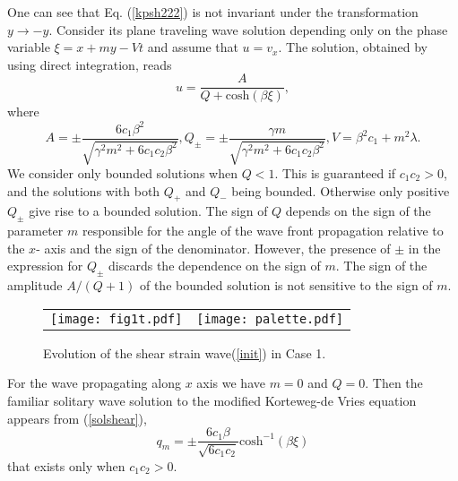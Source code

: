 One can see that Eq. (\ref{kpsh222}) is not invariant under the transformation $y\rightarrow -y$.  Consider its plane traveling wave solution depending only on the phase variable $\xi=x+ m y-V t$ and assume that $u=v_x$. 
The solution, obtained by using direct integration, reads
\begin{equation}
	u=\frac{A}{Q+{\text{cosh}}( \beta \xi)},\label{solshear}
\end{equation}
where
\begin{equation}
	A=\pm \frac{6c_1 \beta^2}{\sqrt{\gamma^2 m^2+6 c_1 c_2 \beta^2}}, 
	Q_{\pm}=\pm\frac{\gamma m }{\sqrt{\gamma^2 m^2+6 c_1 c_2 \beta^2}},  V=\beta^2 c_1+m^2 \lambda . \label{solshearpar}
\end{equation}
We consider only bounded solutions when $Q<1$. This is guaranteed if $c_1 c_2>0$, and the solutions with both $Q_{+}$  and $Q_{-}$ being bounded. Otherwise only positive $Q_{\pm}$ give rise to a bounded solution.  The sign of $Q$ depends on the sign of the parameter $m$ responsible for the angle of the wave front propagation relative to the $x$- axis and the sign of the denominator.  However, the presence of $\pm$ in the expression for $Q_{\pm}$ discards the dependence on the sign of $m$. The sign of the amplitude $A/(Q+1)$ of the bounded solution is not sensitive to the sign of $m$. 
\begin{figure}[h]
	\begin{center}
		\begin{tabular}{cc}
			\texttt{[image: fig1t.pdf]} & \texttt{[image: palette.pdf]}
		\end{tabular}
		\caption{Evolution of the shear strain wave(\ref{init}) in Case 1.}\label{fig1}
	\end{center}
\end{figure}
For the wave propagating along $x$ axis we have $m=0$ and $Q=0$. Then the familiar solitary wave solution to the modified Korteweg-de Vries equation appears from (\ref{solshear}),
\begin{equation}
	q_m=\pm \frac{6c_1\beta}{\sqrt{6 c_1 c_2}}{\text{cosh}}^{-1}(\beta \xi) \label{qp}
\end{equation}
that exists only when $c_1 c_2>0$. 

